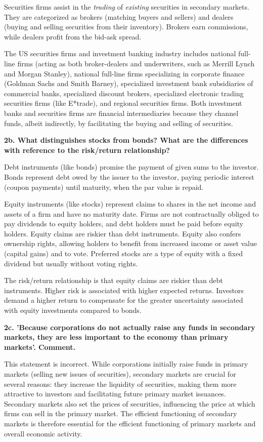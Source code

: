 \documentclass[twoside,openany]{book}
\begin{document}
Securities firms assist in the \textit{trading} of \textit{existing} securities in secondary markets. They are categorized as brokers (matching buyers and sellers) and dealers (buying and selling securities from their inventory). Brokers earn commissions, while dealers profit from the bid-ask spread.

The US securities firms and investment banking industry includes national full-line firms (acting as both broker-dealers and underwriters, such as Merrill Lynch and Morgan Stanley), national full-line firms specializing in corporate finance (Goldman Sachs and Smith Barney), specialized investment bank subsidiaries of commercial banks, specialized discount brokers, specialized electronic trading securities firms (like E*trade), and regional securities firms. Both investment banks and securities firms are financial intermediaries because they channel funds, albeit indirectly, by facilitating the buying and selling of securities.

\textbf{2b. What distinguishes stocks from bonds? What are the differences with reference to the risk/return relationship?}

Debt instruments (like bonds) promise the payment of given sums to the investor. Bonds represent debt owed by the issuer to the investor, paying periodic interest (coupon payments) until maturity, when the par value is repaid.

Equity instruments (like stocks) represent claims to shares in the net income and assets of a firm and have no maturity date. Firms are not contractually obliged to pay dividends to equity holders, and debt holders must be paid before equity holders. Equity claims are riskier than debt instruments. Equity also confers ownership rights, allowing holders to benefit from increased income or asset value (capital gains) and to vote. Preferred stocks are a type of equity with a fixed dividend but usually without voting rights.

The risk/return relationship is that equity claims are riskier than debt instruments. Higher risk is associated with higher expected returns. Investors demand a higher return to compensate for the greater uncertainty associated with equity investments compared to bonds.

\textbf{2c. 'Because corporations do not actually raise any funds in secondary markets, they are less important to the economy than primary markets'. Comment.}

This statement is incorrect. While corporations initially raise funds in primary markets (selling new issues of securities), secondary markets are crucial for several reasons: they increase the liquidity of securities, making them more attractive to investors and facilitating future primary market issuances. Secondary markets also set the prices of securities, influencing the price at which firms can sell in the primary market. The efficient functioning of secondary markets is therefore essential for the efficient functioning of primary markets and overall economic activity.
\end{document}
